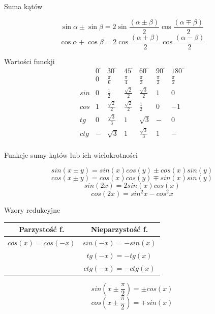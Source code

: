 \documentclass{article}
\newenvironment{kol2}{\noindent \begin{minipage}[t]{0.5\linewidth}}{\end{minipage}}
\begin{document}
\begin{kol2}

    \noindent
    Suma kątów

    $$  \sin{\alpha}\pm\sin{\beta}=
        2\sin{\frac{\left(\alpha\pm\beta\right)}{2}}
        \cos{\frac{\left(\alpha\mp\beta\right)}{2}} $$
    $$  \cos{\alpha}+\cos{\beta}=
        2\cos{\frac{\left(\alpha+\beta\right)}{2}}
        \cos{\frac{\left(\alpha-\beta\right)}{2}} $$
\end{kol2}
\begin{kol2}

    \noindent
    Wartości funckji
    $$
        \begin{array}{c|c|c|c|c|c|c}
            & 0^\circ   & 30^\circ      & 45^\circ      & 60^\circ      & 90^\circ  & 180^\circ  \\
            & 0         & \frac\pi6     & \frac\pi4     & \frac{\pi}3   & \frac\pi2 & \frac\pi2  \\ \hline
        sin & 0         & \frac12       & \frac{\sqrt2}2&\frac{\sqrt3}2 & 1         & 0  \\
        cos & 1         & \frac{\sqrt2}2& \frac{\sqrt2}2& \frac12       & 0         & -1 \\ \hline
        tg  & 0         & \frac{\sqrt3}3& 1             & \sqrt3        & -         & 0  \\
        ctg & -         & \sqrt3        & 1             & \frac{\sqrt3}3& 1         & -  \\
        \end{array}
    $$
\end{kol2}

\vspace{0.5cm}
\begin{kol2}

    \noindent
    Funkcje sumy kątów lub ich wielokrotności

    $$  sin( x\pm y) = sin(x)cos(y) \pm cos(x)sin(y) $$
    $$  cos( x\pm y) = cos(x)cos(y) \mp sin(x)sin(y) $$
    $$  sin(2x) = 2sin(x)cos(x) $$
    $$  cos(2x) = sin^2x - cos^2x   $$

\end{kol2}
\begin{kol2}

    \noindent
    Wzory redukcyjne

    \centering
    \begin{tabular}{c c}
        Parzystość f.       & Nieparzystość f. \\ \hline
        $cos(x) = cos(-x)$  & $sin(-x) = - sin(x)$ \\
                            & $tg(-x) = -tg(x)$ \\
                            & $ctg(-x) = - ctg(x)$ \\
    \end{tabular}

    $$  sin( x \pm \frac{\pi}{2} ) = \pm cos( x ) $$
    $$  cos( x \pm \frac{\pi}{2} ) = \mp sin( x ) $$
\end{kol2}
\end{document}

